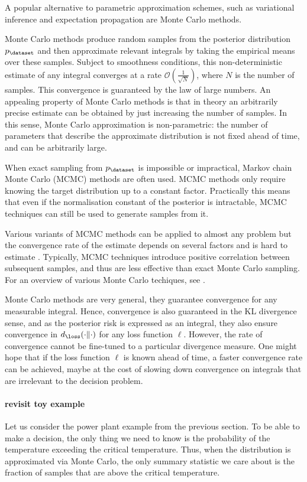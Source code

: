 
A popular alternative to parametric approximation schemes, such as variational inference and expectation propagation are Monte Carlo methods.

Monte Carlo methods produce random samples from the posterior distribution $p_\dataset$ and then approximate relevant integrals by taking the empirical means over these samples. Subject to smoothness conditions, this non-deterministic estimate of any integral converges at a rate $\mathcal{O}(\frac{1}{\sqrt{N}})$, where $N$ is the number of samples. This convergence is guaranteed by the law of large numbers. An appealing property of Monte Carlo methods is that in theory an arbitrarily precise estimate can be obtained by just increasing the number of samples. In this sense, Monte Carlo approximation is non-parametric: the number of parameters that describe the approximate distribution is not fixed ahead of time, and can be arbitrarily large.

When exact sampling from $p_\dataset$ is impossible or impractical, Markov chain Monte Carlo (MCMC) methods are often used. MCMC methods only require knowing the target distribution up to a constant factor. Practically this means that even if the normalisation constant of the posterior is intractable, MCMC techniques can still be used to generate samples from it.

Various variants of MCMC methods can be applied to almost any problem but the convergence rate of the estimate depends on several factors and is hard to estimate \citep{CowlesCarlin96}. Typically, MCMC techniques introduce positive correlation between subsequent samples, and thus are less effective than exact Monte Carlo sampling. For an overview of various Monte Carlo techiques, see \citep{Murray2007}.

Monte Carlo methods are very general, they guarantee convergence for any measurable integral. Hence, convergence is also guaranteed in the KL divergence sense, and as the posterior risk is expressed as an integral, they also ensure convergence in $d_\loss(\cdot\|\cdot)$ for any loss function $\ell$. However, the rate of convergence cannot be fine-tuned to a particular divergence measure. One might hope that if the loss function $\ell$ is known ahead of time, a faster convergence rate can be achieved, maybe at the cost of slowing down convergence on integrals that are irrelevant to the decision problem.

\paragraph{revisit toy example} Let us consider the power plant example from the previous section. To be able to make a decision, the only thing we need to know is the probability of the temperature exceeding the critical temperature. Thus, when the distribution is approximated via Monte Carlo, the only summary statistic we care about is the fraction of samples that are above the critical temperature.

